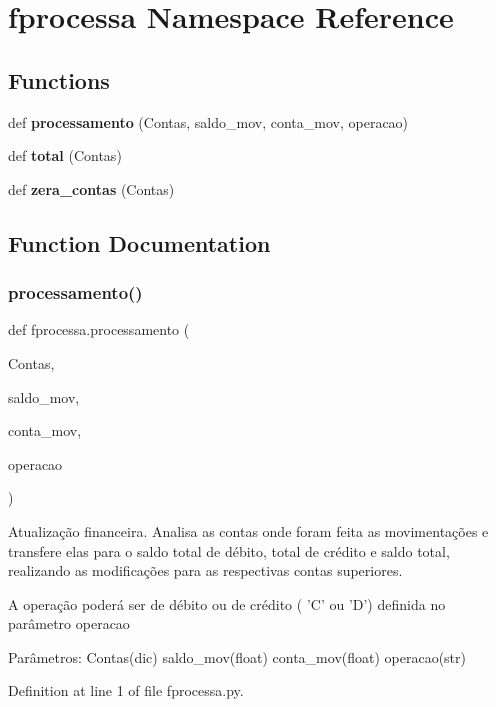 \section{fprocessa Namespace Reference}
\label{namespacefprocessa}
\subsection*{Functions}
\begin{DoxyCompactItemize}
\item 
def \textbf{ processamento} (Contas, saldo\+\_\+mov, conta\+\_\+mov, operacao)
\item 
def \textbf{ total} (Contas)
\item 
def \textbf{ zera\+\_\+contas} (Contas)
\end{DoxyCompactItemize}


\subsection{Function Documentation}
\mbox{\label{namespacefprocessa_ab68fc40541cb16b11066b05f60cb8667}} 
\subsubsection{processamento()}
{\footnotesize\ttfamily def fprocessa.\+processamento (\begin{DoxyParamCaption}\item[{}]{Contas,  }\item[{}]{saldo\+\_\+mov,  }\item[{}]{conta\+\_\+mov,  }\item[{}]{operacao }\end{DoxyParamCaption})}

\begin{DoxyVerb}Atualização financeira. Analisa as contas onde foram feita as movimentações e transfere elas para
o saldo total de débito, total de crédito e saldo total, realizando as modificações para as respectivas
contas superiores.

A operação poderá ser de débito ou de crédito ( 'C' ou 'D') definida no parâmetro operacao

Parâmetros:
Contas(dic)
saldo_mov(float)
conta_mov(float)
operacao(str)
\end{DoxyVerb}
 

Definition at line 1 of file fprocessa.\+py.

